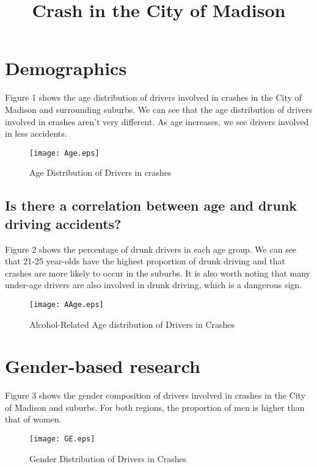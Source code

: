 \documentclass[10pt]{article}
\begin{document}
\title{Crash in the City of Madison}
\author{}
\date{}
\maketitle

\section{Demographics}

\large Figure 1 shows the age distribution of drivers involved in crashes in the City of Madison and surrounding suburbs. We can see that the age distribution of drivers involved in crashes aren't very different. As age increases, we see drivers involved in less accidents.

\begin{figure}[H]
\flushleft
\texttt{[image: Age.eps]}
\caption{Age Distribution of Drivers in crashes}
\label{1}
\end{figure}

\newpage
\subsection{Is there a correlation between age and drunk driving accidents?}

Figure 2 shows the percentage of drunk drivers in each age group. We can see that 21-25 year-olds have the highest proportion of drunk driving and that crashes are more likely to occur in the suburbs. It is also worth noting that many under-age drivers are also involved in drunk driving, which is a dangerous sign.

\begin{figure}[H]
\flushleft
\texttt{[image: AAge.eps]}
\caption{Alcohol-Related Age distribution of Drivers in Crashes}
\label{2}
\end{figure}

\newpage
\section{Gender-based research}

Figure 3 shows the gender composition of drivers involved in crashes in the City of Madison and suburbs. For both regions, the proportion of men is higher than that of women.

\begin{figure}[H]
\flushleft
\texttt{[image: GE.eps]}
\caption{Gender Distribution of Drivers in Crashes}
\label{3}
\end{figure}
\end{document}
